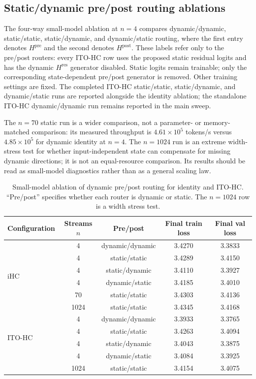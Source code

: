 \documentclass{article}
\newcommand{\Hpre}{H^{\mathrm{pre}}}
\newcommand{\Hpost}{H^{\mathrm{post}}}
\newcommand{\Hres}{H^{\mathrm{res}}}
\begin{document}
\subsection{Static/dynamic pre/post routing ablations}
\label{app:dynamic-pre-post-ablation}
The four-way small-model ablation at $n=4$ compares dynamic/dynamic,
static/static, static/dynamic, and dynamic/static routing, where the first
entry denotes $\Hpre$ and the second denotes $\Hpost$. These labels refer only
to the pre/post routers: every ITO-HC row uses the proposed static residual
logits and has the dynamic $\Hres$ generator disabled. Static logits remain
trainable; only the corresponding state-dependent pre/post generator is
removed. Other training settings are fixed. The completed ITO-HC static/static,
static/dynamic, and dynamic/static runs are reported alongside the identity
ablation; the standalone ITO-HC dynamic/dynamic run remains reported in the
main sweep.

The $n=70$ static run is a wider comparison, not a parameter- or memory-matched comparison: its measured throughput is $4.61\times10^5$ tokens/s versus $4.85\times10^5$ for dynamic identity at $n=4$. The $n=1024$ run is an extreme width-stress test for whether input-independent state can compensate for missing dynamic directions; it is not an equal-resource comparison. Its results should be read as small-model diagnostics rather than as a general scaling law.

\begin{table}[H]
\caption{Small-model ablation of dynamic pre/post routing for identity and ITO-HC. ``Pre/post'' specifies whether each router is dynamic or static. The $n=1024$ row is a width stress test.}
\label{tab:dynamic-pre-post-ablation}
\begin{center}
{\setlength{\tabcolsep}{3pt}
\renewcommand{\arraystretch}{0.9}
\small
\begin{tabular}{l c c c c}
\toprule
Configuration & Streams $n$ & Pre/post & Final train loss & Final val loss \\
\midrule \multirow{6}{*}{iHC}
 & 4 & dynamic/dynamic & 3.4270 & 3.3833 \\
 & 4 & static/static & 3.4289 & 3.4150 \\
 & 4 & static/dynamic & 3.4110 & 3.3927 \\
 & 4 & dynamic/static & 3.4185 & 3.4010 \\
 & 70 & static/static & 3.4303 & 3.4136 \\
 & 1024 & static/static & 3.4345 & 3.4168 \\
\midrule
\multirow{4}{*}{ITO-HC}
 & 4 & dynamic/dynamic & 3.3933 & 3.3765 \\
 & 4 & static/static & 3.4263 & 3.4094 \\
 & 4 & static/dynamic & 3.4043 & 3.3875 \\
 & 4 & dynamic/static & 3.4084 & 3.3925 \\
 & 1024 & static/static & 3.4154 & 3.4075 \\
\bottomrule
\end{tabular}}
\end{center}
\end{table}
\end{document}
